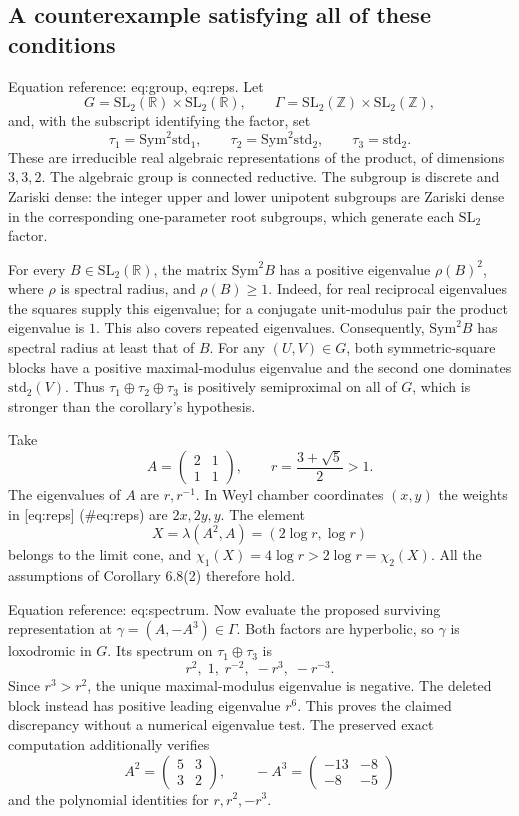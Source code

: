 \documentclass[10pt]{article}
\begin{document}
\subsection*{A counterexample satisfying all of these conditions}
Equation reference: eq:group, eq:reps. Let \[
 G=\mathrm{SL}_2(\mathbb R)\times\mathrm{SL}_2(\mathbb R),\qquad
 \Gamma=\mathrm{SL}_2(\mathbb Z)\times\mathrm{SL}_2(\mathbb Z),\] and, with the subscript identifying the factor, set \[
 \tau_1=\mathrm{Sym}^2\mathrm{std}_1,\qquad
 \tau_2=\mathrm{Sym}^2\mathrm{std}_2,\qquad \tau_3=\mathrm{std}_2.\] These are irreducible real algebraic representations of the product, of dimensions \(3,3,2\). The algebraic group is connected reductive. The subgroup is discrete and Zariski dense: the integer upper and lower unipotent subgroups are Zariski dense in the corresponding one-parameter root subgroups, which generate each \(\mathrm{SL}_2\) factor.\par
For every \(B\in\mathrm{SL}_2(\mathbb R)\), the matrix \(\mathrm{Sym}^2 B\) has a positive eigenvalue \(\rho(B)^2\), where \(\rho\) is spectral radius, and \(\rho(B)\geq1\). Indeed, for real reciprocal eigenvalues the squares supply this eigenvalue; for a conjugate unit-modulus pair the product eigenvalue is \(1\). This also covers repeated eigenvalues. Consequently, \(\mathrm{Sym}^2 B\) has spectral radius at least that of \(B\). For any \((U,V)\in G\), both symmetric-square blocks have a positive maximal-modulus eigenvalue and the second one dominates \(\mathrm{std}_2(V)\). Thus \(\tau_1\oplus\tau_2\oplus\tau_3\) is positively semiproximal on all of \(G\), which is stronger than the corollary’s hypothesis.\par
Take \[A=\begin{pmatrix}2&1\\1&1\end{pmatrix},\qquad
 r=\frac{3+\sqrt5}{2}>1.\] The eigenvalues of \(A\) are \(r,r^{-1}\). In Weyl chamber coordinates \((x,y)\) the weights in [eq:reps] (\#eq:reps) are \(2x,2y,y\). The element \[X=\lambda(A^2,A)=(2\log r,\log r)\] belongs to the limit cone, and \(\chi_1(X)=4\log r>2\log r=\chi_2(X)\). All the assumptions of Corollary 6.8(2) therefore hold.\par
Equation reference: eq:spectrum. Now evaluate the proposed surviving representation at \(\gamma=(A,-A^3)\in\Gamma\). Both factors are hyperbolic, so \(\gamma\) is loxodromic in \(G\). Its spectrum on \(\tau_1\oplus\tau_3\) is \[
 r^2,\;1,\;r^{-2},\;-r^3,\;-r^{-3}.\] Since \(r^3>r^2\), the unique maximal-modulus eigenvalue is negative. The deleted block instead has positive leading eigenvalue \(r^6\). This proves the claimed discrepancy without a numerical eigenvalue test. The preserved exact computation additionally verifies \[A^2=\begin{pmatrix}5&3\\3&2\end{pmatrix},\qquad
 -A^3=\begin{pmatrix}-13&-8\\-8&-5\end{pmatrix}\] and the polynomial identities for \(r,r^2,-r^3\).\par
\end{document}
